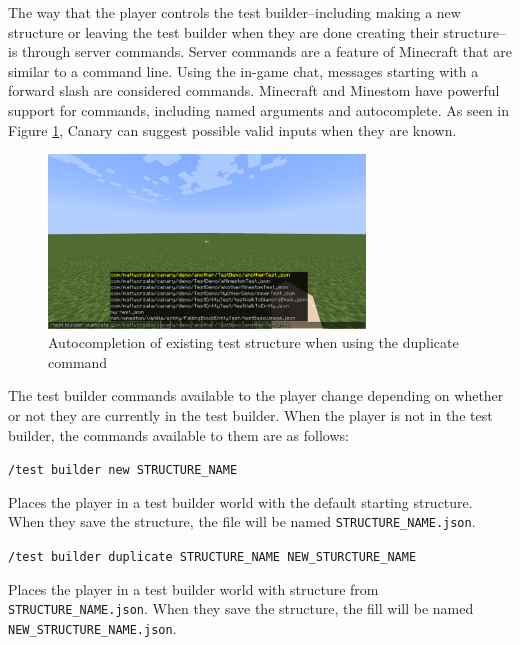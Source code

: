 \documentclass[12pt]{article}
\def\code#1{\texttt{#1}}
\begin{document}
\begin{onehalfspacing}

The way that the player controls the test builder--including making a
new structure or leaving the test builder when they are done creating
their structure--is through server commands. Server commands are a
feature of Minecraft that are similar to a command line. Using the
in-game chat, messages starting with a forward slash are considered
commands. Minecraft and Minestom have powerful support for commands,
including named arguments and autocomplete. As seen in Figure \ref{fig:4_1_2},
Canary can suggest possible valid inputs when they are known.

\begin{figure}[h] 
    \centering
    \includegraphics[width=0.75\textwidth]{media/media/image13.png} 
    \caption{Autocompletion of existing test structure when using the duplicate command} 
    \label{fig:4_1_2}  
\end{figure}


The test builder commands available to the player change depending on
whether or not they are currently in the test builder. When the player
is not in the test builder, the commands available to them are as
follows:

\noindent\code{/test builder new STRUCTURE\_NAME}

Places the player in a test builder world with the default starting
structure. When they save the structure, the file will be named
\code{STRUCTURE\_NAME.json}.

\noindent\code{/test builder duplicate STRUCTURE\_NAME NEW\_STURCTURE\_NAME}

Places the player in a test builder world with structure from
\code{STRUCTURE\_NAME.json}. When they save the structure, the fill will be
named \code{NEW\_STRUCTURE\_NAME.json}.


\end{onehalfspacing}
\end{document}
